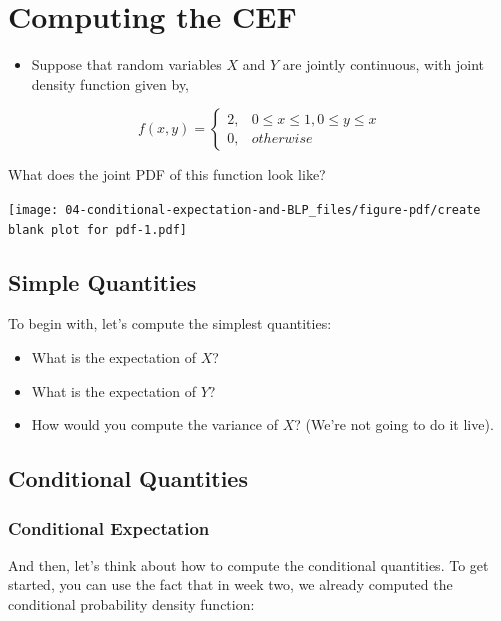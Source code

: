 \documentclass[
  letterpaper,
  DIV=11,
  numbers=noendperiod]{scrreprt}
\providecommand{\tightlist}{%
  \setlength{\itemsep}{0pt}\setlength{\parskip}{0pt}}\usepackage{longtable,booktabs,array}
\begin{document}
\section{Computing the CEF}\label{computing-the-cef}

\begin{itemize}
\tightlist
\item
  Suppose that random variables \(X\) and \(Y\) are jointly continuous,
  with joint density function given by,
\end{itemize}

\[
f(x,y) = 
  \begin{cases}
    2, & 0 \leq x \leq 1, 0 \leq y \leq x \\
    0, & otherwise
\end{cases}
\]

What does the joint PDF of this function look like?

\texttt{[image: 04-conditional-expectation-and-BLP\_files/figure-pdf/create blank plot for pdf-1.pdf]}

\subsection{Simple Quantities}\label{simple-quantities}

To begin with, let's compute the simplest quantities:

\begin{itemize}
\tightlist
\item
  What is the expectation of \(X\)?
\item
  What is the expectation of \(Y\)?
\item
  How would you compute the variance of \(X\)? (We're not going to do it
  live).
\end{itemize}

\subsection{Conditional Quantities}\label{conditional-quantities}

\subsubsection{Conditional Expectation}\label{conditional-expectation}

And then, let's think about how to compute the conditional quantities.
To get started, you can use the fact that in week two, we already
computed the conditional probability density function:
\end{document}

